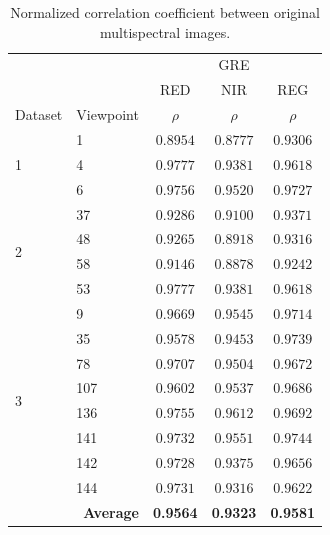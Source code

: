 \renewcommand{\arraystretch}{1.2}
\begin{table}
    \captionsetup{singlelinecheck=off}
    \caption{Normalized correlation coefficient between original multispectral images. }
    \label{table:multispectral_base_correlation}
    \begin{tabular}{ll|c@{\hskip 0.5in}c@{\hskip 0.5in}c}
        \toprule
        & & \multicolumn{3}{c}{GRE} \\
        \cmidrule{1-5}
        & & RED & NIR & REG \\
        \cmidrule{1-5}
        Dataset & Viewpoint & $\rho$ & $\rho$ & $\rho$ \\
        \cmidrule{1-5}
        \multirow{3}{*}{1} & 1 & $0.8954$ & $0.8777$ & $0.9306$\\
        & 4 & $0.9777$ & $0.9381$ & $0.9618$\\
        & 6 & $0.9756$ & $0.9520$ & $0.9727$\\
        \cmidrule{1-5}
        \multirow{4}{*}{2} & 37 & $0.9286$ & $0.9100$ & $0.9371$\\
        & 48 & $0.9265$ & $0.8918$ & $0.9316$\\
        & 58 & $0.9146$ & $0.8878$ & $0.9242$\\
        & 53 & $0.9777$ & $0.9381$ & $0.9618$\\
        \cmidrule{1-5}
        \multirow{8}{*}{3} & 9 & $0.9669$ & $0.9545$ & $0.9714$\\
        & 35 & $0.9578$ & $0.9453$ & $0.9739$\\
        & 78 & $0.9707$ & $0.9504$ & $0.9672$\\
        & 107 & $0.9602$ & $0.9537$ & $0.9686$\\
        & 136 & $0.9755$ & $0.9612$ & $0.9692$\\
        & 141 & $0.9732$ & $0.9551$ & $0.9744$\\
        & 142 & $0.9728$ & $0.9375$ & $0.9656$\\
        & 144 & $0.9731$ & $0.9316$ & $0.9622$\\
        \cmidrule{1-5}
        \multicolumn{2}{r|}{\textbf{Average}} & \textbf{0.9564} & \textbf{0.9323} & \textbf{0.9581}\\
        \bottomrule
    \end{tabular}
\end{table}
\renewcommand{\arraystretch}{1}

